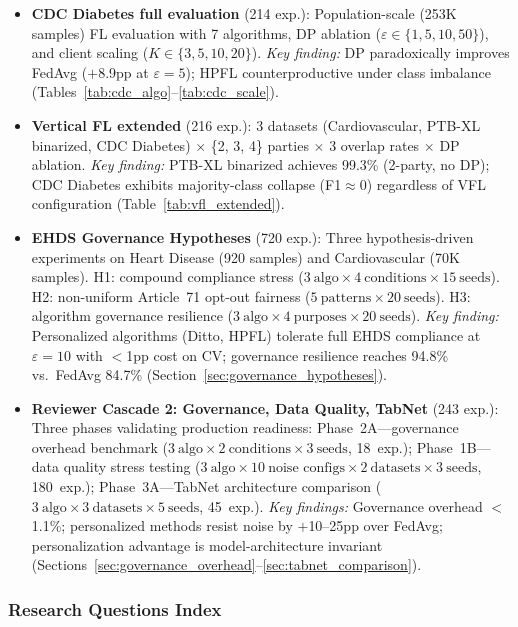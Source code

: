 \documentclass[conference]{IEEEtran}
\begin{document}
\begin{itemize}
    \item \textbf{CDC Diabetes full evaluation} (214 exp.): Population-scale (253K samples) FL evaluation with 7 algorithms, DP ablation ($\varepsilon{\in}\{1, 5, 10, 50\}$), and client scaling ($K{\in}\{3, 5, 10, 20\}$). \textit{Key finding:} DP paradoxically improves FedAvg ($+$8.9pp at $\varepsilon{=}5$); HPFL counterproductive under class imbalance (Tables~\ref{tab:cdc_algo}--\ref{tab:cdc_scale}).
    \item \textbf{Vertical FL extended} (216 exp.): 3 datasets (Cardiovascular, PTB-XL binarized, CDC Diabetes) $\times$ \{2, 3, 4\} parties $\times$ 3 overlap rates $\times$ DP ablation. \textit{Key finding:} PTB-XL binarized achieves 99.3\% (2-party, no DP); CDC Diabetes exhibits majority-class collapse (F1$\approx$0) regardless of VFL configuration (Table~\ref{tab:vfl_extended}).
    \item \textbf{EHDS Governance Hypotheses} (720 exp.): Three hypothesis-driven experiments on Heart Disease (920 samples) and Cardiovascular (70K samples). H1: compound compliance stress ($3~\text{algo} \times 4~\text{conditions} \times 15~\text{seeds}$). H2: non-uniform Article~71 opt-out fairness ($5~\text{patterns} \times 20~\text{seeds}$). H3: algorithm governance resilience ($3~\text{algo} \times 4~\text{purposes} \times 20~\text{seeds}$). \textit{Key finding:} Personalized algorithms (Ditto, HPFL) tolerate full EHDS compliance at $\varepsilon{=}10$ with $<$1pp cost on CV; governance resilience reaches 94.8\% vs.\ FedAvg 84.7\% (Section~\ref{sec:governance_hypotheses}).
    \item \textbf{Reviewer Cascade 2: Governance, Data Quality, TabNet} (243 exp.): Three phases validating production readiness: Phase~2A---governance overhead benchmark ($3~\text{algo} \times 2~\text{conditions} \times 3~\text{seeds}$, 18~exp.); Phase~1B---data quality stress testing ($3~\text{algo} \times 10~\text{noise configs} \times 2~\text{datasets} \times 3~\text{seeds}$, 180~exp.); Phase~3A---TabNet architecture comparison ($3~\text{algo} \times 3~\text{datasets} \times 5~\text{seeds}$, 45~exp.). \textit{Key findings:} Governance overhead $<$1.1\%; personalized methods resist noise by $+$10--25pp over FedAvg; personalization advantage is model-architecture invariant (Sections~\ref{sec:governance_overhead}--\ref{sec:tabnet_comparison}).
\end{itemize}

\subsubsection{Research Questions Index}
\end{document}
